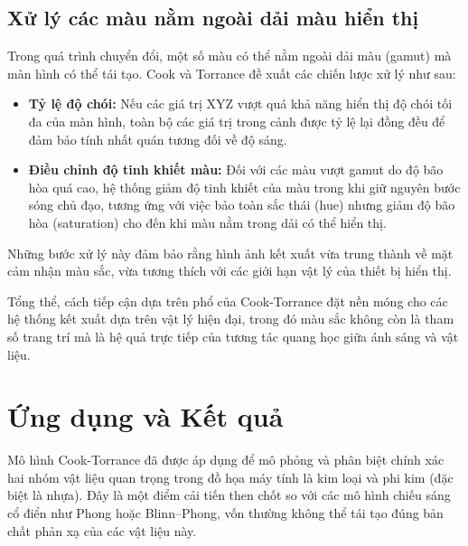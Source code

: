 \subsection{Xử lý các màu nằm ngoài dải màu hiển thị}

Trong quá trình chuyển đổi, một số màu có thể nằm ngoài dải màu (gamut) mà màn hình có thể tái tạo. Cook và Torrance đề xuất các chiến lược xử lý như sau:

\begin{itemize}
	\item \textbf{Tỷ lệ độ chói:}  
	Nếu các giá trị XYZ vượt quá khả năng hiển thị độ chói tối đa của màn hình, toàn bộ các giá trị trong cảnh được tỷ lệ lại đồng đều để đảm bảo tính nhất quán tương đối về độ sáng.
	
	\item \textbf{Điều chỉnh độ tinh khiết màu:}  
	Đối với các màu vượt gamut do độ bão hòa quá cao, hệ thống giảm độ tinh khiết của màu trong khi giữ nguyên bước sóng chủ đạo, tương ứng với việc bảo toàn sắc thái (hue) nhưng giảm độ bão hòa (saturation) cho đến khi màu nằm trong dải có thể hiển thị.
\end{itemize}

Những bước xử lý này đảm bảo rằng hình ảnh kết xuất vừa trung thành về mặt cảm nhận màu sắc, vừa tương thích với các giới hạn vật lý của thiết bị hiển thị.

Tổng thể, cách tiếp cận dựa trên phổ của Cook-Torrance đặt nền móng cho các hệ thống kết xuất dựa trên vật lý hiện đại, trong đó màu sắc không còn là tham số trang trí mà là hệ quả trực tiếp của tương tác quang học giữa ánh sáng và vật liệu.

\section{Ứng dụng và Kết quả}

Mô hình Cook-Torrance đã được áp dụng để mô phỏng và phân biệt chính xác hai nhóm vật liệu quan trọng trong đồ họa máy tính là kim loại và phi kim (đặc biệt là nhựa). Đây là một điểm cải tiến then chốt so với các mô hình chiếu sáng cổ điển như Phong hoặc Blinn--Phong, vốn thường không thể tái tạo đúng bản chất phản xạ của các vật liệu này.

